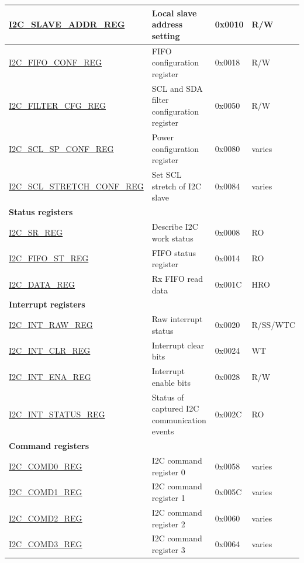 \begin{longtable}{ | p{6cm} | p{7cm} | p{1.3cm} | p{1cm} | }
    \hyperref[regdesc:I2CSLAVEADDRREG]{I2C\_SLAVE\_ADDR\_REG} & Local slave address setting & 0x0010 & R/W \\ \hline
    \hyperref[regdesc:I2CFIFOCONFREG]{I2C\_FIFO\_CONF\_REG} & FIFO configuration register & 0x0018 & R/W \\ \hline
    \hyperref[regdesc:I2CFILTERCFGREG]{I2C\_FILTER\_CFG\_REG} & SCL and SDA filter configuration register & 0x0050 & R/W \\ \hline
    \hyperref[regdesc:I2CSCLSPCONFREG]{I2C\_SCL\_SP\_CONF\_REG} & Power configuration register & 0x0080 & varies \\ \hline
    \hyperref[regdesc:I2CSCLSTRETCHCONFREG]{I2C\_SCL\_STRETCH\_CONF\_REG} & Set SCL stretch of I2C slave & 0x0084 & varies \\ \hline
    \multicolumn{4}{|l|}{\textbf{Status registers}} \\ \hline
    \hyperref[regdesc:I2CSRREG]{I2C\_SR\_REG} & Describe I2C work status & 0x0008 & RO \\ \hline
    \hyperref[regdesc:I2CFIFOSTREG]{I2C\_FIFO\_ST\_REG} & FIFO status register & 0x0014 & RO \\ \hline
    \hyperref[regdesc:I2CDATAREG]{I2C\_DATA\_REG} & Rx FIFO read data & 0x001C & HRO \\ \hline
    \multicolumn{4}{|l|}{\textbf{Interrupt registers}} \\ \hline
    \hyperref[regdesc:I2CINTRAWREG]{I2C\_INT\_RAW\_REG} & Raw interrupt status & 0x0020 & R/SS/WTC \\ \hline
    \hyperref[regdesc:I2CINTCLRREG]{I2C\_INT\_CLR\_REG} & Interrupt clear bits & 0x0024 & WT \\ \hline
    \hyperref[regdesc:I2CINTENAREG]{I2C\_INT\_ENA\_REG} & Interrupt enable bits & 0x0028 & R/W \\ \hline
    \hyperref[regdesc:I2CINTSTATUSREG]{I2C\_INT\_STATUS\_REG} & Status of captured I2C communication events & 0x002C & RO \\ \hline
    \multicolumn{4}{|l|}{\textbf{Command registers}} \\ \hline
    \hyperref[regdesc:I2CCOMD0REG]{I2C\_COMD0\_REG} & I2C command register 0 & 0x0058 & varies \\ \hline
    \hyperref[regdesc:I2CCOMD1REG]{I2C\_COMD1\_REG} & I2C command register 1 & 0x005C & varies \\ \hline
    \hyperref[regdesc:I2CCOMD2REG]{I2C\_COMD2\_REG} & I2C command register 2 & 0x0060 & varies \\ \hline
    \hyperref[regdesc:I2CCOMD3REG]{I2C\_COMD3\_REG} & I2C command register 3 & 0x0064 & varies \\ \hline

\end{longtable}
